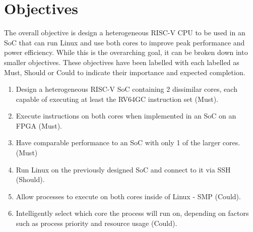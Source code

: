 \documentclass[a4paper,fleqn,11pt]{article}
\begin{document}
\section{Objectives}
The overall objective is design a heterogeneous RISC-V CPU to be used in an SoC that can run Linux and use both cores to improve peak performance and power efficiency. While this is the overarching goal, it can be broken down into smaller objectives. These objectives have been labelled with each labelled as Must, Should or Could to indicate their importance and expected completion.
\begin{enumerate}
    \item Design a heterogeneous RISC-V SoC containing 2 dissimilar cores, each capable of executing at least the RV64GC instruction set (Must).
    \item Execute instructions on both cores when implemented in an SoC on an FPGA (Must).
    \item Have comparable performance to an SoC with only 1 of the larger cores. (Must)
    \item Run Linux on the previously designed SoC and connect to it via SSH (Should).
    \item Allow processes to execute on both cores inside of Linux - SMP (Could).
    \item Intelligently select which core the process will run on, depending on factors such as process priority and resource usage (Could).
\end{enumerate}

\clearpage
\end{document}
